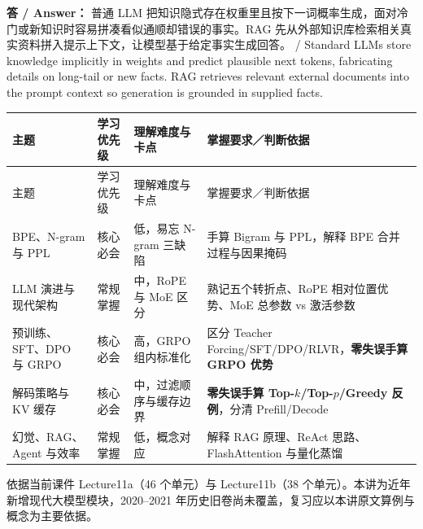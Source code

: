 \textbf{答 / Answer：} 普通 LLM 把知识隐式存在权重里且按下一词概率生成，面对冷门或新知识时容易拼凑看似通顺却错误的事实。RAG 先从外部知识库检索相关真实资料拼入提示上下文，让模型基于给定事实生成回答。 / Standard LLMs store knowledge implicitly in weights and predict plausible next tokens, fabricating details on long-tail or new facts. RAG retrieves relevant external documents into the prompt context so generation is grounded in supplied facts.



\begingroup\small\setlength{\tabcolsep}{3pt}\renewcommand{\arraystretch}{1.22}
\begin{longtable}{@{}>{\raggedright\arraybackslash}p{}>{\raggedright\arraybackslash}p{}>{\raggedright\arraybackslash}p{}>{\raggedright\arraybackslash}p{}@{}}
\toprule
主题 & 学习优先级 & 理解难度与卡点 & 掌握要求／判断依据 \\
\midrule\endfirsthead
主题 & 学习优先级 & 理解难度与卡点 & 掌握要求／判断依据 \\
\midrule\endhead
\bottomrule\endfoot
BPE、N-gram 与 PPL & 核心必会 & 低，易忘 N-gram 三缺陷 & 手算 Bigram 与 $\mathrm{PPL}$，解释 BPE 合并过程与因果掩码 \\
LLM 演进与现代架构 & 常规掌握 & 中，RoPE 与 MoE 区分 & 熟记五个转折点、RoPE 相对位置优势、MoE 总参数 vs 激活参数 \\
预训练、SFT、DPO 与 GRPO & 核心必会 & 高，GRPO 组内标准化 & 区分 Teacher Forcing/SFT/DPO/RLVR，\textbf{零失误手算 GRPO 优势} \\
解码策略与 KV 缓存 & 核心必会 & 中，过滤顺序与缓存边界 & \textbf{零失误手算 Top-$k$/Top-$p$/Greedy 反例}，分清 Prefill/Decode \\
幻觉、RAG、Agent 与效率 & 常规掌握 & 低，概念对应 & 解释 RAG 原理、ReAct 思路、FlashAttention 与量化蒸馏 \\
\end{longtable}\endgroup



依据当前课件 Lecture11a（46 个单元）与 Lecture11b（38 个单元）。本讲为近年新增现代大模型模块，2020–2021 年历史旧卷尚未覆盖，复习应以本讲原文算例与概念为主要依据。

